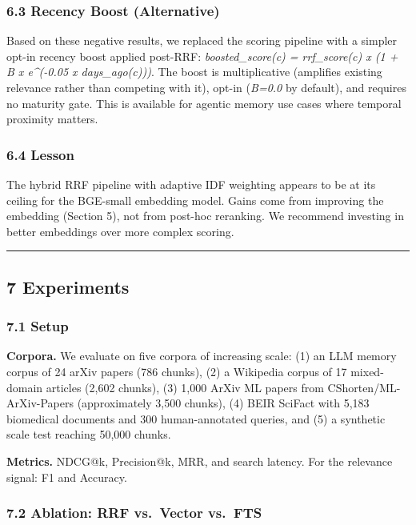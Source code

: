 \documentclass[
  11pt]{article}
\begin{document}
\subsubsection{6.3 Recency Boost (Alternative)}\label{recency-boost-alternative}

Based on these negative results, we replaced the scoring pipeline with a simpler opt-in recency boost applied post-RRF: \emph{boosted\_score(c) = rrf\_score(c) x (1 + B x e\^{}(-0.05 x days\_ago(c)))}. The boost is multiplicative (amplifies existing relevance rather than competing with it), opt-in (\emph{B=0.0} by default), and requires no maturity gate. This is available for agentic memory use cases where temporal proximity matters.

\subsubsection{6.4 Lesson}\label{lesson}

The hybrid RRF pipeline with adaptive IDF weighting appears to be at its ceiling for the BGE-small embedding model. Gains come from improving the embedding (Section 5), not from post-hoc reranking. We recommend investing in better embeddings over more complex scoring.

\begin{center}\rule{0.5\linewidth}{0.5pt}\end{center}

\subsection{7 Experiments}\label{experiments}

\subsubsection{7.1 Setup}\label{setup}

\textbf{Corpora.} We evaluate on five corpora of increasing scale: (1) an LLM memory corpus of 24 arXiv papers (786 chunks), (2) a Wikipedia corpus of 17 mixed-domain articles (2,602 chunks), (3) 1,000 ArXiv ML papers from CShorten/ML-ArXiv-Papers (approximately 3,500 chunks), (4) BEIR SciFact with 5,183 biomedical documents and 300 human-annotated queries, and (5) a synthetic scale test reaching 50,000 chunks.

\textbf{Metrics.} NDCG@k, Precision@k, MRR, and search latency. For the relevance signal: F1 and Accuracy.

\subsubsection{7.2 Ablation: RRF vs.~Vector vs.~FTS}\label{ablation-rrf-vs.-vector-vs.-fts}
\end{document}
